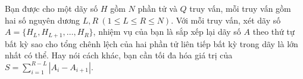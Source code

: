 Bạn được cho một dãy số $H$ gồm $N$ phần tử và $Q$ truy vấn, mỗi truy vấn gồm hai số nguyên dương $L,R\ (1\le L\le R\le N)$. Với mỗi truy vấn, xét dãy số $A=\{H_L,H_{L+1},\dots,H_R\}$, nhiệm vụ của bạn là sắp xếp lại dãy số $A$ theo thứ tự bất kỳ sao cho tổng chênh lệch của hai phần tử liên tiếp bất kỳ trong dãy là lớn nhất có thể. Hay nói cách khác, bạn cần tối đa hóa giá trị của $S=\sum_{i=1}^{R-L}|A_i-A_{i+1}|$.
